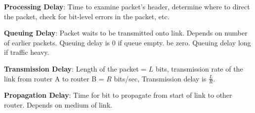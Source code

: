 \documentclass{scrartcl}
\begin{document}
\raggedright
\begin{multicols*}{3}


{\bf Processing Delay}: Time to examine packet's header, determine where to direct the packet, check for bit-level errors in the packet, etc.

{\bf Queuing Delay}: Packet waits to be transmitted onto link. Depends on number of earlier packets. Queuing delay is 0 if queue empty. be zero. Queuing delay long if traffic heavy.

{\bf Transmission Delay}: Length of the packet = $L$ bits, transmission rate of the link from router A to router B = $R$ bits/sec, Transmission delay is $\frac{L}{R}$.

{\bf Propagation Delay}: Time for bit to propagate from start of link to other router. Depends on medium of link.


\end{multicols*}
\end{document}
